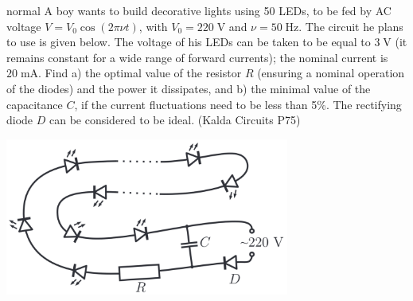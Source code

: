 \hypertarget{P60}{}
\begin{solution}{normal} %
A boy wants to build decorative lights using 50 LEDs, to be fed by AC voltage $V=V_0\cos(2\pi\nu t)$, with $V_0= 220\;\text{V}$ and $\nu= 50\;\text{Hz}$.  The circuit he plans to use is given below. The voltage of his LEDs can be taken to be equal to $3\;\text{V}$ (it remains constant for a wide range of forward currents); the nominal current is $20\;\text{mA}$. Find a) the optimal value of the resistor $R$ (ensuring a nominal operation of the diodes) and the power it dissipates, and b) the minimal value of the capacitance $C$, if the current fluctuations need to be less than 5\%. The rectifying diode $D$ can be considered to be ideal. (Kalda Circuits P75)
\begin{center}
    \includegraphics[width=0.7\textwidth]{S2 Figures/S2-60.png}
\end{center}
\end{solution}